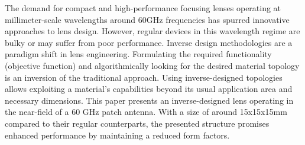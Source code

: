 The demand for compact and high-performance focusing lenses operating at millimeter-scale wavelengths around 60GHz frequencies has spurred innovative approaches to lens design. However, regular devices in this wavelength regime are bulky or may suffer from poor performance. Inverse design methodologies are a paradigm shift in lens engineering. Formulating the required functionality (objective function) and algorithmically looking for the desired material topology is an inversion of the traditional approach. Using inverse-designed topologies allows exploiting a material's capabilities beyond its usual application area and necessary dimensions. This paper presents an inverse-designed lens operating in the near-field of a 60 GHz patch antenna. With a size of around 15x15x15mm compared to their regular counterparts, the presented structure promises enhanced performance by maintaining a reduced form factors. 
